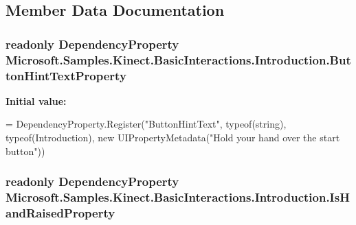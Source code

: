 \subsection{Member Data Documentation}
\hypertarget{class_microsoft_1_1_samples_1_1_kinect_1_1_basic_interactions_1_1_introduction_a6633260b33c7e9c4d0208f294b1096bf}{
\subsubsection[{Button\-Hint\-Text\-Property}]{\setlength{\rightskip}{0pt plus 5cm}readonly Dependency\-Property Microsoft.\-Samples.\-Kinect.\-Basic\-Interactions.\-Introduction.\-Button\-Hint\-Text\-Property\hspace{0.3cm}{\ttfamily [static]}}}\label{class_microsoft_1_1_samples_1_1_kinect_1_1_basic_interactions_1_1_introduction_a6633260b33c7e9c4d0208f294b1096bf}
{\bfseries Initial value\-:}
\begin{DoxyCode}
=
            DependencyProperty.Register(\textcolor{stringliteral}{"ButtonHintText"}, typeof(\textcolor{keywordtype}{string}), typeof(Introduction), \textcolor{keyword}{new} 
      UIPropertyMetadata(\textcolor{stringliteral}{"Hold your hand over the start button"}))
\end{DoxyCode}
\hypertarget{class_microsoft_1_1_samples_1_1_kinect_1_1_basic_interactions_1_1_introduction_a20b4198a7ac9ce9494eb27c238b64044}{
\subsubsection[{Is\-Hand\-Raised\-Property}]{\setlength{\rightskip}{0pt plus 5cm}readonly Dependency\-Property Microsoft.\-Samples.\-Kinect.\-Basic\-Interactions.\-Introduction.\-Is\-Hand\-Raised\-Property\hspace{0.3cm}{\ttfamily [static]}}}\label{class_microsoft_1_1_samples_1_1_kinect_1_1_basic_interactions_1_1_introduction_a20b4198a7ac9ce9494eb27c238b64044}
